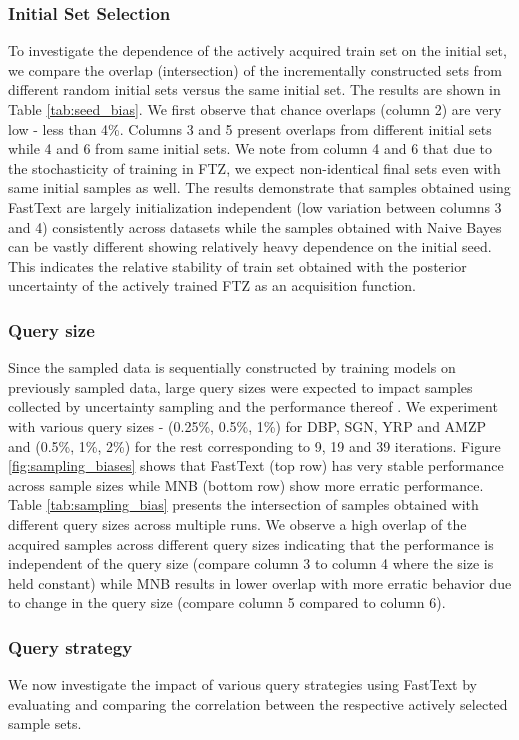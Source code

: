 \documentclass[11pt,a4paper]{article}
\begin{document}
\subsubsection{Initial Set Selection}
To investigate the dependence of the actively acquired train set on the initial set, we compare the overlap (intersection) of the incrementally constructed sets from different random initial sets versus the same initial set. The results are shown in Table \ref{tab:seed_bias}. We first observe that chance overlaps (column 2) are very low - less than 4\%. Columns 3 and 5 present overlaps from different initial sets while 4 and 6 from same initial sets. We note from column 4 and 6 that due to the stochasticity of training in FTZ, we expect non-identical final sets even with same initial samples as well. The results demonstrate that samples obtained using FastText are largely initialization independent (low variation between columns 3 and 4) consistently across datasets while the samples obtained with Naive Bayes can be vastly different showing relatively heavy dependence on the initial seed. This indicates the relative stability of train set obtained with the posterior uncertainty of the actively trained FTZ as an acquisition function.


\subsubsection{Query size}
\label{subsubsec:querysize}
Since the sampled data is sequentially constructed by training models on previously sampled data, large query sizes  were expected to impact samples collected by uncertainty sampling and the performance thereof \cite{hoi2006large}. We experiment with various query sizes - (0.25\%, 0.5\%, 1\%) for DBP, SGN, YRP and AMZP and (0.5\%, 1\%, 2\%) for the rest corresponding to 9, 19 and 39 iterations. Figure \ref{fig:sampling_biases} shows that FastText (top row) has very stable performance across sample sizes while MNB (bottom row) show more erratic performance. Table \ref{tab:sampling_bias} presents the intersection of samples obtained with different query sizes across multiple runs. We observe a high overlap of the acquired samples across different query sizes indicating that the performance is independent of the query size (compare column 3 to column 4 where the size is held constant) while MNB results in lower overlap with more erratic behavior due to change in the query size (compare column 5 compared to column 6). 

\subsubsection{Query strategy}
\label{subsubsec:qstrategy}
We now investigate the impact of various query strategies using FastText by evaluating and comparing the correlation between the respective actively selected sample sets.
\end{document}

